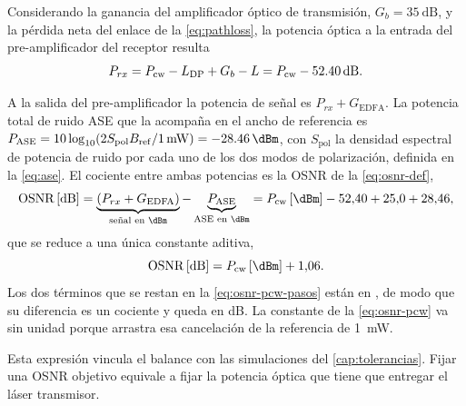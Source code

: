 Considerando la ganancia del amplificador \'optico de transmisi\'on,
$G_b = \SI{35}{\dB}$, y la p\'erdida neta del enlace de la
\eqref{eq:pathloss}, la potencia \'optica a la entrada del pre-amplificador del
receptor resulta
\begin{equation}
  P_{rx} = \Pcw - L_{\mathrm{DP}} + G_b - L = \Pcw - \SI{52.40}{\dB}.
  \label{eq:prx}
\end{equation}

A la salida del pre-amplificador la potencia de se\~nal es
$P_{rx} + G_{\mathrm{EDFA}}$. La potencia total de ruido ASE que la acompa\~na
en el ancho de referencia es
$P_{\mathrm{ASE}} = 10\log_{10}\!\left(2S_{\mathrm{pol}}\Bref/\SI{1}{\milli\watt}\right)
= \SI{-28.46}{\dBm}$, con $S_{\mathrm{pol}}$ la densidad espectral de potencia
de ruido por cada uno de los dos modos de polarizaci\'on, definida en la
\eqref{eq:ase}. El cociente entre ambas potencias es la OSNR de la
\eqref{eq:osnr-def},
\begin{equation}
  \OSNR\,[\si{\dB}]
    = \underbrace{\left(P_{rx} + G_{\mathrm{EDFA}}\right)}_{\text{se\~nal en }\si{\dBm}}
      - \underbrace{P_{\mathrm{ASE}}}_{\text{ASE en }\si{\dBm}}
    = \Pcw\,[\si{\dBm}] - 52{,}40 + 25{,}0 + 28{,}46,
  \label{eq:osnr-pcw-pasos}
\end{equation}
que se reduce a una \'unica constante aditiva,
\begin{equation}
  \OSNR\,[\si{\dB}] = \Pcw\,[\si{\dBm}] + 1{,}06.
  \label{eq:osnr-pcw}
\end{equation}
Los dos t\'erminos que se restan en la \eqref{eq:osnr-pcw-pasos} est\'an en
\si{\dBm}, de modo que su diferencia es un cociente y queda en \si{\dB}. La
constante de la \eqref{eq:osnr-pcw} va sin unidad porque arrastra esa
cancelaci\'on de la referencia de \SI{1}{\milli\watt}.

Esta expresi\'on vincula el balance con las simulaciones del
\cref{cap:tolerancias}. Fijar una OSNR objetivo equivale a fijar la potencia
\'optica que tiene que entregar el l\'aser transmisor.


